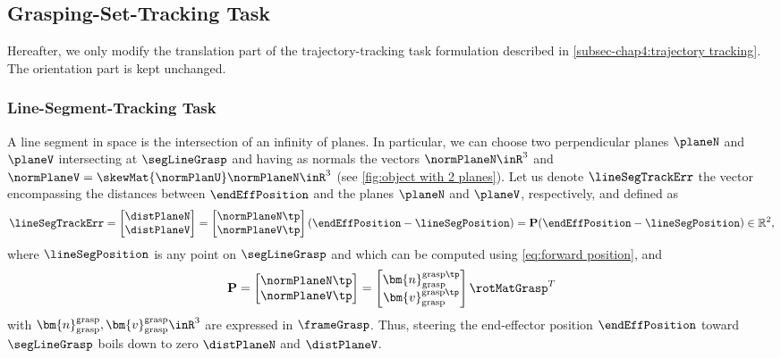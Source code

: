 	\subsection{Grasping-Set-Tracking Task}\label{subsec-chap4:grasping-set-tracking}
	Hereafter, we only modify the translation part of the trajectory-tracking task formulation described in \cref{subsec-chap4:trajectory tracking}. The orientation part is kept unchanged.
	\subsubsection{Line-Segment-Tracking Task}\label{subsubsec:line-seg-tracking task}
	A  line segment in space is the intersection of an infinity of planes. In particular, we can choose two perpendicular planes $\planeN$ and $\planeV$ intersecting at $\segLineGrasp$ and having as normals the vectors $\normPlaneN\inR^3$ and $\normPlaneV=\skewMat{\normPlanU}\normPlaneN\inR^3$ (see \cref{fig:object with 2 planes}). 
	Let us denote $\lineSegTrackErr$ the vector encompassing the distances between $\endEffPosition$ and the planes $\planeN$ and $\planeV$, respectively, and defined as 
	\begin{align}
		\lineSegTrackErr = 
		\begin{bmatrix}
			\distPlaneN \\ \distPlaneV
		\end{bmatrix} = 
		\begin{bmatrix}
			\normPlaneN\tp\\ \normPlaneV\tp
		\end{bmatrix}(\endEffPosition - \lineSegPosition) = \mathbf{P}(\endEffPosition - \lineSegPosition) \in\mathbb{R}^{2},
	\end{align}  where $\lineSegPosition$ is any point on $\segLineGrasp$ and which can be computed using \cref{eq:forward position}, and 
	\begin{equation}
		\mathbf{P} = \begin{bmatrix}
			\normPlaneN\tp \\ \normPlaneV\tp
		\end{bmatrix} = \begin{bmatrix}
			\bm{n}_{\rm grasp}^{{\rm grasp}\tp} \\ \bm{v}_{\rm grasp}^{{\rm grasp}\tp}
		\end{bmatrix}\rotMatGrasp^T
	\end{equation}
	with $\bm{n}_{\rm grasp}^{{\rm grasp}},\bm{v}_{\rm grasp}^{{\rm grasp}}\inR^3 $ are expressed in $\frameGrasp$.
	Thus, steering the end-effector position $\endEffPosition$ toward $\segLineGrasp$ boils down to zero $\distPlaneN$ and $\distPlaneV$. 
